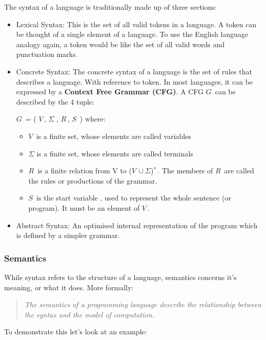 \documentclass[ %
                    author={Jonathan Rankin},
                supervisor={Dr. David May, Dr. Ian Holyer},
                    degree={MEng},
                     title={CodeTouch},
                  subtitle={A Revolutionary Way To Program Real Code On Touch Screen Devices},
                      type={enterprise},
                      year={2015 } ]{dissertation}
\begin{document}
The syntax of a language is traditionally made up of three sections:
\begin{itemize}
\item {Lexical Syntax: }
This is the set of all valid tokens in a language. A token can be thought of a single element of a language. To use the English language analogy again, a token would be like the set of all valid words and punctuation marks. 

\item{Concrete Syntax: }
The concrete syntax of a language is the set of rules that describes a language. With reference to token. In most languages, it can be expressed by a \textbf{Context Free Grammar (CFG)}. A CFG $G\,$ can be described by the 4 tuple\cite{Sipser}:

$G\,$ = ( $V\,$, $\Sigma$ , $R\,$, $S\,$ ) where:

\begin{itemize}
\item
$V\,$  is a finite set, whose elements are called variables
\item
$\Sigma$ is a finite set, whose elements are called terminals
\item
$R\,$ is a finite relation from V to ($V\,\cup\Sigma$)$^{*}\,$. The members of $R\,$ are called the rules or productions of the grammar. 
\item
$S\,$ is the start variable , used to represent the whole sentence (or program). It must be an element of $V\,$.
\end{itemize}



\item{Abstract Syntax: }
An optimised internal representation of the program which is defined by a simpler grammar. 
\end{itemize}


\subsubsection{Semantics}
While syntax refers to the structure of a language, semantics concerns it's meaning, or what it does. More formally: 

\begin{quote}
\textit{The semantics of a programming language describe the relationship between the syntax and the model of computation\cite{semantics}.}
\end{quote}

To demonstrate this let's look at an example: 
\end{document}
